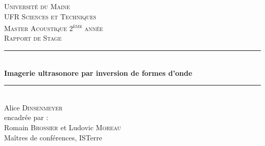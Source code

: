 \documentclass[a4paper,11pt]{report} %
\begin{document}

\begin{titlepage}

\newcommand{\HRule}{\rule{\linewidth}{0.5mm}} %

\center %
 

\textsc{\large Université du Maine \\ UFR Sciences et Techniques}\\[0.5cm] %

\textsc{ \large Master Acoustique 2\textsuperscript{ème} année}\\[3.0cm] %
\textsc{\Large Rapport de Stage}\\[0.5cm] %


\HRule \\[0.7cm]
{ \huge \bfseries Imagerie ultrasonore par inversion de formes d'onde}\\[0.4cm] %
\HRule \\[1.5cm]
 


{\Large Alice \textsc{Dinsenmeyer}}\\[3cm]

\Large encadrée par : \\[1cm]
Romain \textsc{Brossier} et
Ludovic \textsc{Moreau}\\
Maîtres de conférences, ISTerre



\end{titlepage}
\end{document}
